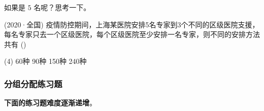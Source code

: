 \begin{problem}
如果是 $5$ 名呢？思考一下。
\end{problem}

\begin{example}
    (2020·全国) 疫情防控期间，上海某医院安排5名专家到3个不同的区级医院支援，每名专家只去一个区级医院，每个区级医院至少安排一名专家，则不同的安排方法共有 (\hspace{0.6cm})
    \begin{tasks}(4)
        \task 60种
        \task 90种
        \task 150种
        \task 240种
    \end{tasks}
\end{example}

\subsubsection{分组分配练习题}

\textbf{下面的练习题难度逐渐递增}。
\vspace{0.4cm}

